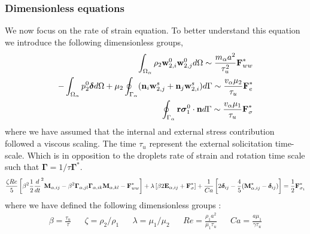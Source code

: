 \subsubsection{Dimensionless equations}

We now focus on the rate of strain equation. 
To better understand this equation we introduce the following dimensionless groups, 
\begin{align*}
    \int_{\Omega_{\alpha}} \rho_2 \textbf{w}_{2,i}^0\textbf{w}_{2,j}^0 d\Omega
    \sim \frac{m_\alpha a^2}{\tau_u^2} \textbf{F}_{ww}^*
    \\
    - \int_{\Omega_{\alpha}} p_2^0\bm\delta d\Omega
    + \mu_2 \oint_{\Gamma_{\alpha}} (\textbf{n}_i \textbf{w}_{2,j}^s + \textbf{n}_j \textbf{w}_{2,i}^s) d\Gamma
    \sim \frac{v_\alpha \mu_2}{\tau_u} \textbf{F}_{e}^*
    \\
    \oint_{\Gamma_{\alpha}} \textbf r \bm\sigma_1^0 \cdot \textbf{n} d\Gamma
    \sim 
    \frac{v_\alpha \mu_1}{\tau_u} \textbf{F}_{\sigma}^*
\end{align*} 
where we have assumed that the internal and external stress contribution followed a viscous scaling. 
The time $\tau_u$ represent the external solicitation time-scale. 
Which is in opposition to the droplets rate of strain and rotation time scale such that $\bm\Gamma = 1/\tau \bm\Gamma^*$. 
\begin{align*}
    \frac{\zeta Re}{5}\left[
        \beta^2 \frac{1}{2}\frac{d}{dt}^2 \textbf{M}_{\alpha,ij}
    -   \beta^2 \bm\Gamma_{\alpha,jl}\bm\Gamma_{\alpha,ik} \textbf{M}_{\alpha,kl}  
    - \textbf{F}_{ww}^*
    \right]
    + \lambda  \left[
        \beta 2\textbf{E}_{\alpha,ij}
    +  \textbf{F}_\sigma^*
    \right]
    + \frac{1}{Ca} \left[
    2\bm\delta_{ij} 
    - \frac{4  }{5} (\textbf{M}_{\alpha,ij}^* - \bm\delta_{ij})
    \right]
    = 
    \frac{1}{2}
    \textbf{F}_{\sigma_1}^*
\end{align*}
where we have defined the following dimensionless groups : 
\begin{align*}
    \beta = \frac{\tau_u}{\tau}
    && \zeta = \rho_2 /\rho_1
    && \lambda = \mu_1/\mu_2 
    && Re = \frac{\rho_1 a^2 }{ \mu_1 \tau_u}
    && Ca = \frac{a \mu_1}{\gamma \tau_u}
\end{align*}

